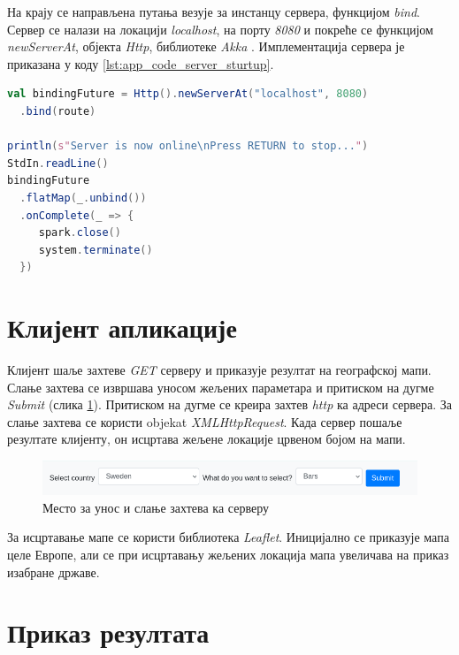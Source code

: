 \documentclass[12pt,oneside]{memoir}
\begin{document}
На крају се направљена путања везује за инстанцу сервера, функцијом \textit{bind}. Сервер се налази на локацији \textit{localhost}, на порту \textit{8080} и покреће се функцијом \textit{newServerAt}, објекта \textit{Http}, библиотеке \textit{Akka} \cite{using_akka_http}. Имплементација сервера је приказана у коду \ref{lst:app_code_server_sturtup}.

\begin{lstlisting}[caption={Имплементација сервера}, language=Scala, label={lst:app_code_server_sturtup}]
val bindingFuture = Http().newServerAt("localhost", 8080)
  .bind(route)

println(s"Server is now online\nPress RETURN to stop...")
StdIn.readLine()
bindingFuture
  .flatMap(_.unbind())
  .onComplete(_ => {
     spark.close()
     system.terminate()
  })
\end{lstlisting}


\section{Клијент апликације}
\label{sec:app_client}

Клијент шаље захтеве \textit{GET} серверу и приказује резултат на географској мапи. Слање захтева се извршава уносом жељених параметара и притиском на дугме \textit{Submit} (слика \ref{fig:app_code_request_bar_front}). Притиском на дугме се креира захтев \textit{http} ка адреси сервера. За слање захтева се користи objekat \textit{XMLHttpRequest}. Када сервер пошаље резултате клијенту, он исцртава жељене локације црвеном бојом на мапи.

\begin{figure}[!ht]
  \centering
  \includegraphics[width=1\textwidth]{pictures/frontend_request_bar.png}
  \caption{Место за унос и слање захтева ка серверу}
  \label{fig:app_code_request_bar_front}
\end{figure}

За исцртавање мапе се користи библиотека \textit{Leaflet}. Иницијално се приказује мапа целе Европе, али се при исцртавању жељених локација мапа увеличава на приказ изабране државе.

\section{Приказ резултата}
\label{sec:rezultat}
\end{document}
